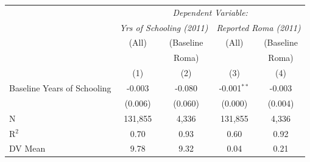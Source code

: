 \begin{tabular}[t]{lcccc}
\toprule
& \multicolumn{4}{c}{\textit{Dependent Variable:}}\\
& \multicolumn{2}{c}{\textit{Yrs of Schooling (2011)}} & \multicolumn{2}{c}{\textit{Reported Roma (2011)}}\\
& (All) & (Baseline & (All) & (Baseline\\
&  & Roma) &  & Roma)\\
& (1) & (2) & (3) & (4) \\
\midrule
Baseline Years of Schooling & -0.003 & -0.080 & -0.001$^{**}$ & -0.003 \\
& (0.006) & (0.060) & (0.000) & (0.004) \\
\midrule
N & 131,855 & 4,336 & 131,855 & 4,336 \\
R$^2$ & 0.70 & 0.93 & 0.60 & 0.92 \\
DV Mean & 9.78 & 9.32 & 0.04 & 0.21 \\
\bottomrule
\end{tabular}
